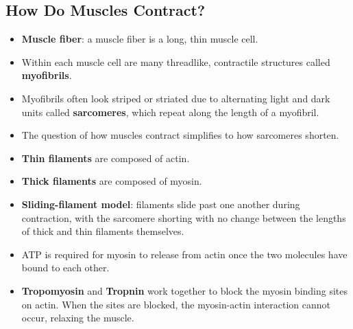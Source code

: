 \documentclass[12pt,a4paper]{article}
\begin{document}
\subsection{How Do Muscles Contract?}
\begin{itemize}
    \item \textbf{Muscle fiber}: a muscle fiber is a long, thin muscle cell. 
    \item Within each muscle cell are many threadlike, contractile structures called \textbf{myofibrils}. 
    \item Myofibrils often look striped or striated due to alternating light and dark units called \textbf{sarcomeres}, which repeat along the length of a myofibril.
    \item The question of how muscles contract simplifies to how sarcomeres shorten.
    \item \textbf{Thin filaments} are composed of actin.
    \item \textbf{Thick filaments} are composed of myosin.
    \item \textbf{Sliding-filament model}: filaments slide past one another during contraction, with the sarcomere shorting with no change between the lengths of thick and thin filaments themselves. 
    \item ATP is required for myosin to release from actin once the two molecules have bound to each other.
    \item \textbf{Tropomyosin} and \textbf{Tropnin} work together to block the myosin binding sites on actin. When the sites are blocked, the myosin-actin interaction cannot occur, relaxing the muscle. 
\end{itemize}
\end{document}
